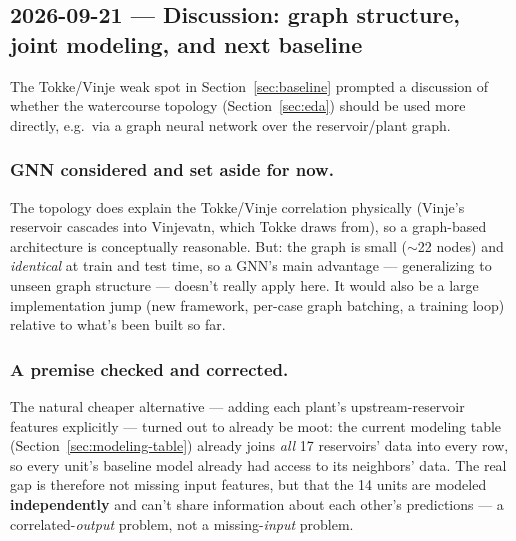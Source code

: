 \subsection{2026-09-21 --- Discussion: graph structure, joint modeling, and next baseline}
\label{sec:discussion-next}

The Tokke/Vinje weak spot in Section~\ref{sec:baseline} prompted a discussion of whether the
watercourse topology (Section~\ref{sec:eda}) should be used more directly, e.g.\ via a graph
neural network over the reservoir/plant graph.

\subsubsection*{GNN considered and set aside for now.} The topology does explain the Tokke/Vinje
correlation physically (Vinje's reservoir cascades into Vinjevatn, which Tokke draws from), so a
graph-based architecture is conceptually reasonable. But: the graph is small ($\sim$22 nodes)
and \emph{identical} at train and test time, so a GNN's main advantage --- generalizing to
unseen graph structure --- doesn't really apply here. It would also be a large implementation
jump (new framework, per-case graph batching, a training loop) relative to what's been built so
far.

\subsubsection*{A premise checked and corrected.} The natural cheaper alternative --- adding each
plant's upstream-reservoir features explicitly --- turned out to already be moot: the current
modeling table (Section~\ref{sec:modeling-table}) already joins \emph{all} 17 reservoirs' data
into every row, so every unit's baseline model already had access to its neighbors' data. The
real gap is therefore not missing input features, but that the 14 units are modeled
\textbf{independently} and can't share information about each other's predictions --- a
correlated-\emph{output} problem, not a missing-\emph{input} problem.

